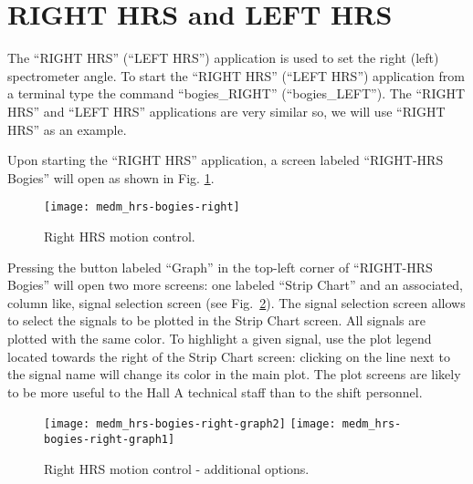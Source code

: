 {\section{RIGHT HRS and LEFT HRS}
The ``RIGHT HRS'' (``LEFT HRS'') application is used to set the right (left)
spectrometer angle.
To start the ``RIGHT HRS'' (``LEFT HRS'')
application from a terminal type the command ``bogies\_RIGHT'' (``bogies\_LEFT'').
The ``RIGHT HRS'' and ``LEFT HRS'' applications are very similar so, we will
use ``RIGHT HRS'' as an example.

Upon starting the ``RIGHT HRS'' application, 
a screen labeled ``RIGHT-HRS Bogies'' will open as 
shown in Fig. \ref{fig:medm-hrs-bogies}.
\begin{figure}[htb]
\begin{center}
    \texttt{[image: medm\_hrs-bogies-right]}
\caption[Right HRS Motion Control]{Right HRS motion control.}
\label{fig:medm-hrs-bogies}
\end{center}
\end{figure}

Pressing the button labeled ``Graph'' in the top-left corner of ``RIGHT-HRS Bogies''
will open two more screens: one labeled ``Strip Chart'' and an associated, column like,
signal selection screen (see Fig.~\ref{fig:medm-hrs-bogies-graph}).
The signal selection screen allows to select the signals
to be plotted in the Strip Chart screen. All signals are plotted with the same color.
To highlight a given signal,
use the plot legend located towards the right of the Strip Chart screen: clicking on the line next
to the signal name will change its color in the main plot.
The plot screens are likely to be more useful to the Hall A technical staff than to the
shift personnel.
\begin{figure}[htb]
\begin{center}
    \texttt{[image: medm\_hrs-bogies-right-graph2]}
    \texttt{[image: medm\_hrs-bogies-right-graph1]}
\caption[Right HRS Motion Control - additional options]{Right HRS motion control - additional options.}
\label{fig:medm-hrs-bogies-graph}
\end{center}
\end{figure}


}
